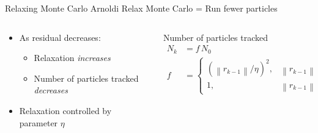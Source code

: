 \documentclass[xcolor={usenames, dvipsnames},]{beamer}
\begin{document}
\begin{frame}{Relaxing Monte Carlo Arnoldi}
    Relax Monte Carlo = Run fewer particles
    \begin{columns}[t]
    \begin{column}{0.45\textwidth}
    \begin{itemize}
        \item As residual decreases:
        \begin{itemize}
            \item Relaxation \emph{increases}
            \item Number of particles tracked \emph{decreases}
        \end{itemize}
        \item Relaxation controlled by parameter $\eta$
    \end{itemize}
    \end{column}
        
    \begin{column}{0.55\textwidth}
        \begin{block}{Number of particles tracked}
            \begin{align*}
                N_k &= f\,N_0 \\[0.5em]
                f &= 
                \begin{cases}
                    \left(\left\|r_{k-1}\right\|/\eta\right)^2, & \left\|r_{k-1}\right\| < \eta \\
                    1, & \left\|r_{k-1}\right\| \geq \eta
                \end{cases}
            \end{align*}
        \end{block}
    \end{column}
    \end{columns}
    
\end{frame}
\end{document}
